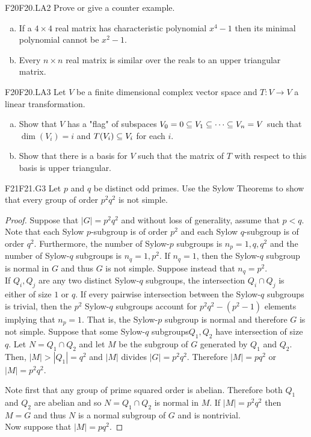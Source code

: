 \documentclass[../AlgebraQualSolutions.tex]{subfiles}
\begin{document}
	\begin{prob}{F20}{F20.LA2}
	Prove or give a counter example.
	\begin{enumerate}[(a)]
	\item If a $4 \times 4$ real matrix has characteristic polynomial $x^4 -1$ then its minimal polynomial cannot be $x^2 - 1$.
	\item Every $n \times n$ real matrix is similar over the reals to an upper triangular matrix.
	\end{enumerate}
	\end{prob}
	
	\begin{prob}{F20}{F20.LA3}
	Let $V$ be a finite dimensional complex vector space and $T: V \to V$ a linear transformation.
	\begin{enumerate}[(a)]
	\item Show that $V$ has a "flag" of subspaces $V_0 = 0 \subseteq V_1 \subseteq \cdots \subseteq V_n = V$ such that $\dim(V_i) = i$ and $T(V_i) \subseteq V_i$ for each $i$.
	\item Show that there is a basis for $V$ such that the matrix of $T$ with respect to this basis is upper triangular.
	\end{enumerate}
	\end{prob}
	

	
	\begin{prob}{F21}{F21.G3}
	Let $p$ and $q$ be distinct odd primes. Use the Sylow Theorems to show that every group of order $p^2q^2$ is not simple.
	\end{prob}	
	
	\begin{proof}
	Suppose that $|G| = p^2q^2$ and without loss of generality, assume that $p < q$. Note that each Sylow $p$-subgroup is of order $p^2$ and each Sylow $q$-subgroup is of order $q^2$. Furthermore, the number of Sylow-$p$ subgroups is $n_p = 1, q, q^2$ and the number of Sylow-$q$ subgroups is $n_q = 1, p^2$. If $n_q = 1$, then the Sylow-$q$ subgroup is normal in $G$ and thus $G$ is not simple. Suppose instead that $n_q = p^2$.\\
	
	If $Q_i, Q_j$ are any two distinct Sylow-$q$ subgroups, the intersection $Q_i \cap Q_j$ is either of size $1$ or $q$. If every pairwise intersection between the Sylow-$q$ subgroups is trivial, then the $p^2$ Sylow-$q$ subgroups account for $p^2q^2 - (p^2 -1)$ elements implying that $n_p = 1$. That is, the Sylow-$p$ subgroup is normal and therefore $G$ is not simple. Suppose that some Sylow-$q$ subgroups$Q_1, Q_2$ have intersection of size $q$. Let $N = Q_1 \cap Q_2$ and let $M$ be the subgroup of $G$ generated by $Q_1$ and $Q_2$. Then, $|M| > |Q_1| = q^2$ and $|M|$ divides $|G| = p^2q^2$. Therefore $|M| = pq^2$ or $|M| = p^2 q^2$. 
	
Note first that any group of prime squared order is abelian. Therefore both $Q_1$ and $Q_2$ are abelian and so $N = Q_1 \cap Q_2$ is normal in $M$. If $|M| = p^2q^2$ then $M=G$ and thus $N$ is a normal subgroup of $G$ and is nontrivial.\\

Now suppose that $|M| = pq^2$. 
	\end{proof}
	
\end{document}
